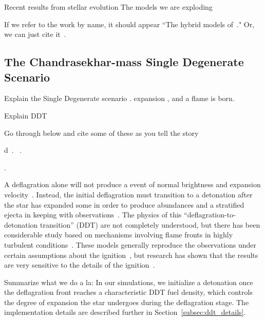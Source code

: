 \documentclass[iop,apj]{emulateapj}
\newcommand{\secref}[1]{Section~\ref{#1}}
\begin{document}
Recent results from stellar evolution
The models we are exploding \citep{brooksetal2017}

If we refer to the work by name, it should appear ``The hybrid models
of~\citet{brooksetal2017}." Or, we can just cite it~\citep{brooksetal2017}.


\subsection{The Chandrasekhar-mass Single Degenerate Scenario}

Explain the Single Degenerate scenario
\citep{Baraffe2004Stability-of-Su,WoosWunsKuhl04,wunschwoosley2004,Kuhletal06,nonakaetal2012}.
expansion \citep{Nomo84,WoosWunsKuhl04}, and a flame is born. 

Explain DDT

Go through below and cite some of these as you tell the story

d~\citep{arnett.truran.ea:nucleosynthesis}.
~\citep{mazzalietal2008}.  


\citep{khokhlov1993,bychovliberman1995,
SNrt,Khok95,NiemHill95,khoketal1997,ZingDurs07,
cholazarianvishniac2003,
roepkehn2003,roepkehn2004,
Zingale2005Three-dimension,Schmetal06a, Schmetal06b,Aspdetal08,
Woosetal09,csetal2009,hicksrosner2013,c-ssr2013,
jacketal2014,poludnenko2015,hicks2015}.


A deflagration alone will not produce a event of normal brightness and
expansion velocity~\citep{roepkeetal07}. Instead, the initial
deflagration must transition to a detonation after the star has
expanded some in order to produce abundances and a stratified ejecta
in keeping with
observations~\citep{Khokhlov1991Delayed-detonat,hokowh95}.
The physics of this ``deflagration-to-detonation transition'' (DDT)
are not completely understood, but there has been considerable study
based on mechanisms involving flame fronts in highly turbulent
conditions~\citep{1986SvAL, woosley90, Khokhlov1991Delayed-detonat,
  hokowh95, HoefKhok96, khoketal1997, NiemWoos97, hwt98, Niem99,
  GameKhokOran05,roepke07, poletal2011,c-ssr2013,poludnenko2015}.
These models generally reproduce the observations under certain
assumptions about the ignition~\citep{townetal2009}, but research has
shown that the results are very sensitive to the details of the
ignition~\citep{PlewCaldLamb04,GameKhokOran05,garciasenz:2005,
  roepkeetal07,Jordan2008Three-Dimension}.

Summarize what we do a la:
In our simulations, we
initialize a detonation once the deflagration front reaches a
characteristic DDT fuel density, which controls the degree of
expansion the star undergoes during the deflagration stage. The
implementation details are described further in
\secref{subsec:ddt_details}.
\end{document}
